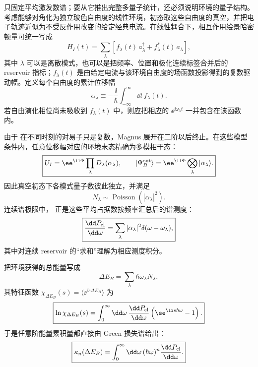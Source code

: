  只固定平均激发数谱；要从它推出完整多量子统计，还必须说明环境的量子结构。考虑能够对角化为独立玻色自由度的线性环境，初态取这些自由度的真空，并把电子轨迹近似为不受反作用改变的给定经典电流。在线性耦合下，相互作用绘景哈密顿量可统一写成
\begin{equation}
 \boxed{
 H_I(t)
 =\sum_\lambda
 \left[f_\lambda(t)\,a_\lambda^\dagger
 +f_\lambda^*(t)\,a_\lambda\right],}
 \label{eq:prescribed-current-linear-bath-hamiltonian-dp85}
\end{equation}
其中 $\lambda$ 可以是离散模式，也可以是把频率、位置和极化连续标签合并后的 reservoir 指标；$f_\lambda(t)$ 是由给定电流与该环境自由度的场函数投影得到的复数驱动幅。定义每个自由度的累计位移幅
\begin{equation}
 \boxed{
 \alpha_\lambda
 \equiv-\frac{\ii}{\hbar}
 \int_{-\infty}^{\infty}\dd t\,f_\lambda(t).}
 \label{eq:prescribed-current-mode-displacement-dp85}
\end{equation}
若自由演化相位尚未吸收到 $f_\lambda(t)$ 中，则应把相应的 $\ee^{\ii\omega_\lambda t}$ 一并包含在该函数内。

由于 在不同时刻的对易子只是复数，Magnus 展开在二阶以后终止。在这些模型条件内，任意位移幅对应的环境末态精确为多模相干态：
\begin{equation}
 \boxed{
 U_I=\ee^{\ii\Phi}\prod_\lambda D_\lambda(\alpha_\lambda),
 \qquad
 |\Psi_B^{\rm out}\rangle
 =\ee^{\ii\Phi}\bigotimes_\lambda|\alpha_\lambda\rangle.}
 \label{eq:prescribed-current-multimode-coherent-state-dp85}
\end{equation}
因此真空初态下各模式量子数彼此独立，并满足
\begin{equation*}
 N_\lambda\sim\operatorname{Poisson}(|\alpha_\lambda|^2).
\end{equation*}
连续谱极限中， 正是这些平均占据数按频率汇总后的谱测度：
\begin{equation}
 \boxed{
 \frac{\dd P_{\rm cl}}{\dd\omega}
 =\sum_\lambda|\alpha_\lambda|^2
 \delta(\omega-\omega_\lambda),}
 \label{eq:green-loss-spectrum-mode-measure-dp85}
\end{equation}
其中对连续 reservoir 的“求和”理解为相应测度积分。

把环境获得的总能量写成
\begin{equation*}
 \Delta E_B=\sum_\lambda\hbar\omega_\lambda N_\lambda,
\end{equation*}
其特征函数 $\chi_{\Delta E_B}(s)=\langle \ee^{\ii s\Delta E_B}\rangle$ 为
\begin{equation}
 \boxed{
 \ln\chi_{\Delta E_B}(s)
 =\int_0^\infty\dd\omega\,
 \frac{\dd P_{\rm cl}}{\dd\omega}
 \left(\ee^{\ii s\hbar\omega}-1\right).}
 \label{eq:green-loss-compound-poisson-cgf-dp84}
\end{equation}
于是任意阶能量累积量都直接由 Green 损失谱给出：
\begin{equation}
 \boxed{
 \kappa_n(\Delta E_B)
 =\int_0^\infty\dd\omega\,
 (\hbar\omega)^n
 \frac{\dd P_{\rm cl}}{\dd\omega}.}
 \label{eq:green-loss-cumulants-dp84}
\end{equation}

